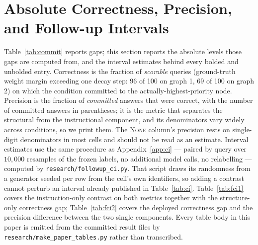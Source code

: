 \section{Absolute Correctness, Precision, and Follow-up Intervals}
\label{app:followup}

Table~\ref{tab:commit} reports gaps; this section reports the absolute
levels those gaps are computed from, and the interval estimates behind every
bolded and unbolded entry. Correctness is the fraction of \emph{scorable}
queries (ground-truth weight margin exceeding one decay step: 96 of 100 on
graph 1, 69 of 100 on graph 2) on which the condition committed to the
actually-highest-priority node. Precision is the fraction of \emph{committed}
answers that were correct, with the number of committed answers in
parentheses; it is the metric that separates the structural from the
instructional component, and its denominators vary widely across conditions,
so we print them. The \textsc{None} column's precision rests on single-digit
denominators in most cells and should not be read as an estimate.
Interval estimates use the same procedure as Appendix~\ref{app:ci} --- paired
by query over $10{,}000$ resamples of the frozen labels, no additional model
calls, no relabelling --- computed by \texttt{research/followup\_ci.py}. That
script draws its randomness from a generator seeded per row from the cell's
own identifiers, so adding a contrast cannot perturb an interval already
published in Table~\ref{tab:ci}. Table~\ref{tab:fci1} covers the
instruction-only contrast on both metrics together with the structure-only
correctness gap; Table~\ref{tab:fci2} covers the deployed correctness gap and
the precision difference between the two single components. Every table body
in this paper is emitted from the committed result files by
\texttt{research/make\_paper\_tables.py} rather than transcribed.

